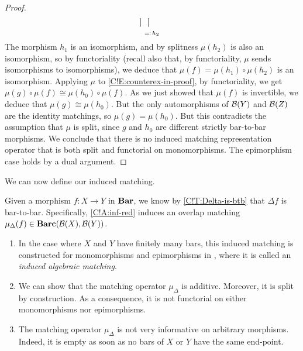 \begin{proof}
\[{\begin{blockarray}{c cc}
\begin{block}{c [cc]}
      \end{block}
    \end{blockarray}}_{\eqcolon \, h_2}
  \]
  The morphism $h_1$ is an isomorphism, and by splitness $\mu(h_2)$ is also an isomorphism, so by functoriality (recall also that, by functoriality, $\mu$ sends isomorphisms to isomorphisms), we deduce that $\mu(f) = \mu(h_1) \circ \mu(h_2)$ is an isomorphism. Applying $\mu$ to \eqref{C!E:counterex-in-proof}, by functoriality, we get $\mu(g) \circ \mu(f) \cong \mu(h_0) \circ \mu(f)$. As we just showed that $\mu(f)$ is invertible, we deduce that $\mu(g) \cong \mu(h_0)$. But the only automorphisms of $\cc{B}(Y)$ and $\cc{B}(Z)$ are the identity matchings, so $\mu(g) = \mu(h_0)$. But this contradicts the assumption that $\mu$ is split, since $g$ and $h_0$ are different strictly bar-to-bar morphisms. We conclude that there is no induced matching representation operator that is both split and functorial on monomorphisms. The epimorphism case holds by a dual argument.
\end{proof}

We can now define our induced matching.

\begin{definition}
\label{C!D:Delta-matching}
  Given a morphism $f \colon X \to Y$ in $\Bar$, we know by \cref{C!T:Delta-is-btb} that $\Delta f$ is bar-to-bar. Specifically, \cref{C!A:inf-red} induces an overlap matching $\mu_\Delta(f) \in \Barc(\cc{B}(X), \cc{B}(Y))$.
\end{definition}

\begin{remark}
  \begin{enumerate}
    \item In the case where $X$ and $Y$ have finitely many bars, this induced matching is constructed for monomorphisms and epimorphisms in \cite[Theorems 6.11 \& 6.13]{bubenik2018algebraic}, where it is called an \textit{induced algebraic matching}.
    \item We can show that the matching operator $\mu_\Delta$ is additive. Moreover, it is split by construction. As a consequence, it is not functorial on either monomorphisms nor epimorphisms.
    \item The matching operator $\mu_\Delta$ is not very informative on arbitrary morphisms. Indeed, it is empty as soon as no bars of $X$ or $Y$ have the same end-point. \qedhere
  \end{enumerate}
\end{remark}

